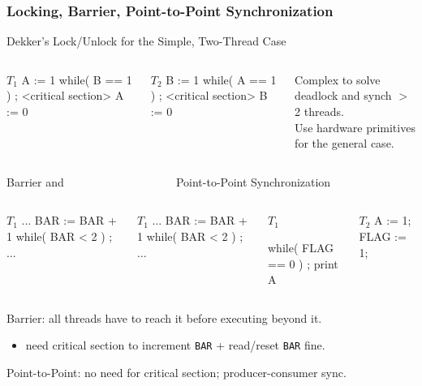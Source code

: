 \documentclass{beamer}
\renewcommand{\emph}[1]{\textcolor{structure}{#1}}
\newcommand{\emp}[1]{\textcolor{DikuRed}{ #1}}
\newcommand{\mymath}[1]{$ #1 $}
\newcommand{\myindx}[1]{_{#1}}
\begin{document}
\begin{frame}[fragile,t]
\frametitle{Locking, Barrier, Point-to-Point Synchronization}

\begin{block}{Dekker's Lock/Unlock for the Simple, Two-Thread Case}
\begin{columns}
\begin{colorcode}[fontsize=\scriptsize]
\mymath{T\myindx{1}}
\emph{A := 1}
while( \emp{B == 1} ) ;
<critical section>
\emph{A := 0}
\end{colorcode} 
\begin{colorcode}[fontsize=\scriptsize]
\mymath{T\myindx{2}}
\emp{B := 1}
while( \emph{A == 1} ) ;
<critical section>
\emp{B := 0}
\end{colorcode} 
\emp{Complex to solve deadlock and synch $>$ 2 threads.}\\
\emph{Use hardware primitives for the general case.}
\end{columns}
\end{block}

\begin{block}{Barrier and {\tt~~~~~~~~~~~~~~~~~~} Point-to-Point Synchronization}
\begin{columns}
\begin{colorcode}[fontsize=\scriptsize]
\mymath{T\myindx{1}}
...
BAR := BAR + 1
while( BAR < 2 ) ;
...
\end{colorcode} 
\begin{colorcode}[fontsize=\scriptsize]
\mymath{T\myindx{1}}
...
BAR := BAR + 1
while( BAR < 2 ) ;
...
\end{colorcode} 
\begin{colorcode}[fontsize=\scriptsize]
\mymath{T\myindx{1}}


while( FLAG == 0 ) ;
print A
\end{colorcode} 
\begin{colorcode}[fontsize=\scriptsize]
\mymath{T\myindx{2}}
A    := 1;
FLAG := 1;


\end{colorcode} 
\end{columns}
\end{block}
\medskip
\pause
 
\emp{Barrier}: all threads have to reach it before executing beyond it.
\begin{itemize}
    \item \alert{need critical section to increment {\tt BAR}} + \emph{read/reset {\tt BAR} fine}.
\end  {itemize}
\medskip

\emp{Point-to-Point}: no need for critical section; producer-consumer sync.

\end{frame}
\end{document}
